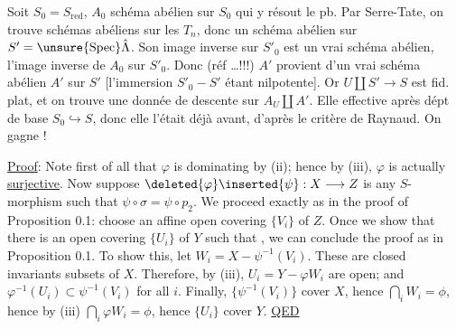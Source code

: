 Soit $S_0=S_{\mathrm{red}}$, $A_0$ schéma abélien sur $S_0$ qui y résout le pb. Par Serre-Tate, on trouve  schémas abéliens sur les $T_n$, donc un schéma  abélien  sur $S'=\unsure{\operatorname{Spec}}\hat\Lambda$. Son image inverse sur $S'_0$ est un vrai schéma abélien,   l'image inverse de $A_0$ sur $S'_0$. Donc (réf \dots !!!) $A'$ provient d'un vrai schéma abélien $A'$ sur $S'$ [l'immersion $S'_0\mathbin{-}S'$ étant nilpotente]. Or $U\amalg S'\to S$ est fid. plat, et on trouve une donnée de descente sur $A_U\amalg A'$. Elle  effective après dépt de base $S_0\hookrightarrow S$, donc elle l'était déjà avant, d'après le critère de Raynaud. On gagne !


\uline{Proof}: Note first of all that $\varphi$ is dominating by (ii); hence by (iii), $\varphi$ is actually \uline{surjective}. Now suppose $\deleted{\varphi}\inserted{\psi}:X\longrightarrow Z$ is any $S$-morphism such that $\psi\circ\sigma=\psi\circ p_2$. We proceed exactly as in the proof of Proposition 0.1: choose an affine open covering $\{V_i\}$ of $Z$. Once we show that there is an open covering $\{U_i\}$ of $Y$ such that
,
we can conclude the proof as in Proposition 0.1. To show this, let $W_i=X-\psi^{-1}(V_i)$. These are closed invariants subsets of $X$. Therefore, by (iii), $U_i=Y-\varphi W_i$ are open; and $\varphi^{-1}(U_i)\subset\psi^{-1}(V_i)$ for all $i$. Finally, $\{\psi^{-1}(V_i)\}$ cover $X$, hence $\bigcap_iW_i=\phi$, hence by (iii) $\bigcap_i\varphi W_i=\phi$, hence $\{U_i\}$ cover $Y$. \uline{QED}

